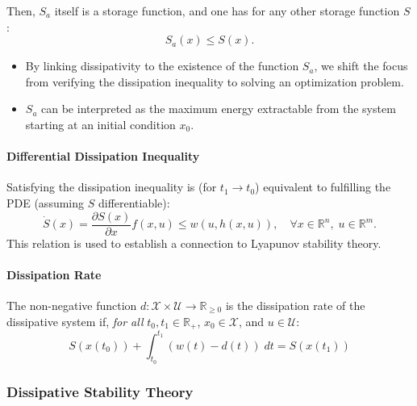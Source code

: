 Then, $S_a$ itself is a storage function, and one has for any other storage function $S$:
\begin{equation*}
    S_a(x) \leq S(x).
\end{equation*}

\newpar{}

\begin{itemize}
    \item By linking dissipativity to the existence of the function $S_a$, we shift the focus from verifying the dissipation inequality to solving an optimization problem.
    \item $S_a$ can be interpreted as the maximum energy extractable from the system starting at an initial condition $x_0$.
\end{itemize}

\paragraph{Differential Dissipation Inequality}

Satisfying the dissipation inequality is (for $t_1 \to t_0$) equivalent to fulfilling the PDE (assuming $S$ differentiable):
\begin{equation*}
    \dot{S}(x) = \frac{\partial S(x)}{\partial x} f(x, u) \leq w(u, h(x, u)), \quad \forall x \in \mathbb{R}^n, \; u \in \mathbb{R}^m.
\end{equation*}
This relation is used to establish a connection to Lyapunov stability theory.

\paragraph{Dissipation Rate}

The non-negative function $d : \mathcal{X} \times \mathcal{U} \to \mathbb{R}_{\geq 0}$ is the dissipation rate of the dissipative system if, \textit{for all} $t_0, t_1 \in \mathbb{R}_+$, $x_0 \in \mathcal{X}$, and $u \in \mathcal{U}$:
\begin{equation*}
    S(x(t_0)) + \int_{t_0}^{t_1} (w(t) - d(t)) \; dt = S(x(t_1))
\end{equation*}

\subsubsection{Dissipative Stability Theory}


